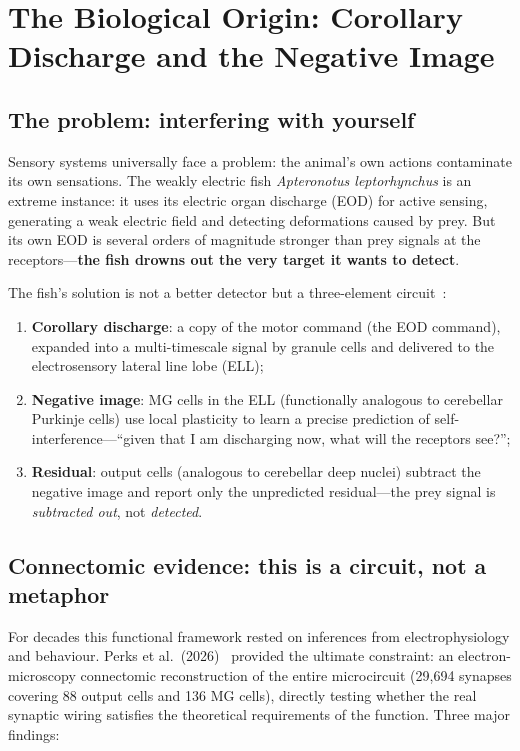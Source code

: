 \documentclass[12pt,a4paper]{article}
\begin{document}
\section{The Biological Origin: Corollary Discharge and the Negative Image}
\label{sec:bio}

\subsection{The problem: interfering with yourself}

Sensory systems universally face a problem: the animal's own actions contaminate its own sensations. The weakly electric fish \emph{Apteronotus leptorhynchus} is an extreme instance: it uses its electric organ discharge (EOD) for active sensing, generating a weak electric field and detecting deformations caused by prey. But its own EOD is several orders of magnitude stronger than prey signals at the receptors---\textbf{the fish drowns out the very target it wants to detect}.

The fish's solution is not a better detector but a three-element circuit~\cite{bell1981,bastian1986}:

\begin{enumerate}
  \item \textbf{Corollary discharge}: a copy of the motor command (the EOD command), expanded into a multi-timescale signal by granule cells and delivered to the electrosensory lateral line lobe (ELL);
  \item \textbf{Negative image}: MG cells in the ELL (functionally analogous to cerebellar Purkinje cells) use local plasticity to learn a precise prediction of self-interference---``given that I am discharging now, what will the receptors see?'';
  \item \textbf{Residual}: output cells (analogous to cerebellar deep nuclei) subtract the negative image and report only the unpredicted residual---the prey signal is \emph{subtracted out}, not \emph{detected}.
\end{enumerate}

\subsection{Connectomic evidence: this is a circuit, not a metaphor}

For decades this functional framework rested on inferences from electrophysiology and behaviour. Perks et al.\ (2026)~\cite{perks2026} provided the ultimate constraint: an electron-microscopy connectomic reconstruction of the entire microcircuit (29{,}694 synapses covering 88 output cells and 136 MG cells), directly testing whether the real synaptic wiring satisfies the theoretical requirements of the function. Three major findings:
\end{document}
